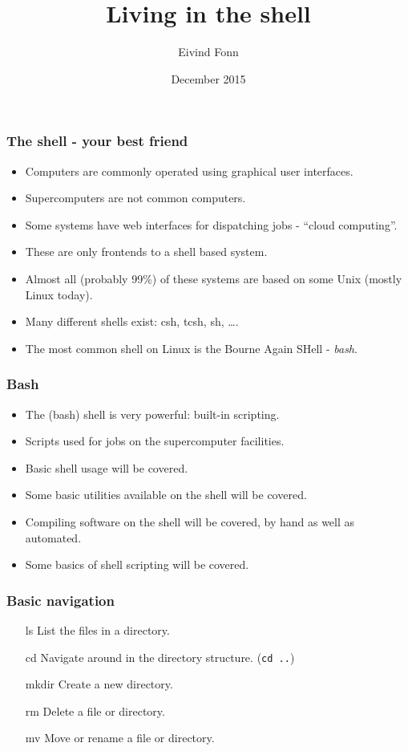 

\title{Living in the shell}
\author{Eivind Fonn}
\date{December 2015}
\maketitle

\begin{frame}
  \frametitle{The shell - your best friend}

  \begin{itemize}
  \item Computers are commonly operated using graphical user interfaces.
  \item Supercomputers are not common computers.
  \item Some systems have web interfaces for dispatching jobs - ``cloud computing''.
  \item These are only frontends to a shell based system.
  \item Almost all (probably 99\%) of these systems are based on some Unix (mostly Linux today).
  \item Many different shells exist: csh, tcsh, sh, \ldots.
  \item The most common shell on Linux is the Bourne Again SHell - \emph{bash}.
  \end{itemize}
\end{frame}

\begin{frame}
  \frametitle{Bash}

  \begin{itemize}
  \item The (bash) shell is very powerful: built-in scripting.
  \item Scripts used for jobs on the supercomputer facilities.
  \item Basic shell usage will be covered.
  \item Some basic utilities available on the shell will be covered.
  \item Compiling software on the shell will be covered, by hand as well as automated.
  \item Some basics of shell scripting will be covered.
  \end{itemize}
\end{frame}

\begin{frame}
  \frametitle{Basic navigation}

  \begin{itemize}
    \setlength{\itemindent}{1cm}
  \item[ls] List the files in a directory.
  \item[cd] Navigate around in the directory structure. (\texttt{cd ..})
  \item[mkdir] Create a new directory.
  \item[rm] Delete a file or directory.
  \item[mv] Move or rename a file or directory.
  \end{itemize}
\end{frame}

